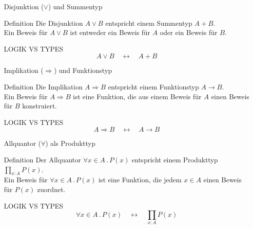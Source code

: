 \documentclass{beamer}
\begin{document}
\begin{frame}{Disjunktion (\(\vee\)) und Summentyp}
    \begin{block}{Definition}
        Die Disjunktion \( A \vee B \) entspricht einem Summentyp \( A + B \). \\
        Ein Beweis für \( A \vee B \) ist entweder ein Beweis für \( A \) oder ein Beweis für \( B \).
    \end{block}

    \begin{block}{LOGIK VS TYPES}
        \[
        A \vee B \quad \leftrightarrow \quad A + B
        \]
    \end{block}

\end{frame}

\begin{frame}{Implikation (\(\Rightarrow\)) und Funktionstyp}
    \begin{block}{Definition}
        Die Implikation \( A \Rightarrow B \) entspricht einem Funktionstyp \( A \to B \). \\
        Ein Beweis für \( A \Rightarrow B \) ist eine Funktion, die aus einem Beweis für \( A \) einen Beweis für \( B \) konstruiert.
    \end{block}

    \begin{block}{LOGIK VS TYPES}
        \[
        A \Rightarrow B \quad \leftrightarrow \quad A \to B
        \]
    \end{block}
\end{frame}

\begin{frame}{Allquantor (\(\forall\)) als Produkttyp}
    \begin{block}{Definition}
        Der Allquantor \( \forall x \in A \, . \, P(x) \) entspricht einem Produkttyp \( \prod_{x : A} P(x) \). \\
        Ein Beweis für \( \forall x \in A \, . \, P(x) \) ist eine Funktion, die jedem \( x \in A \) einen Beweis für \( P(x) \) zuordnet.
    \end{block}

    \begin{block}{LOGIK VS TYPES}
        \[
        \forall x \in A \, . \, P(x) \quad \leftrightarrow \quad \prod_{x : A} P(x)
        \]
    \end{block}

\end{frame}
\end{document}
